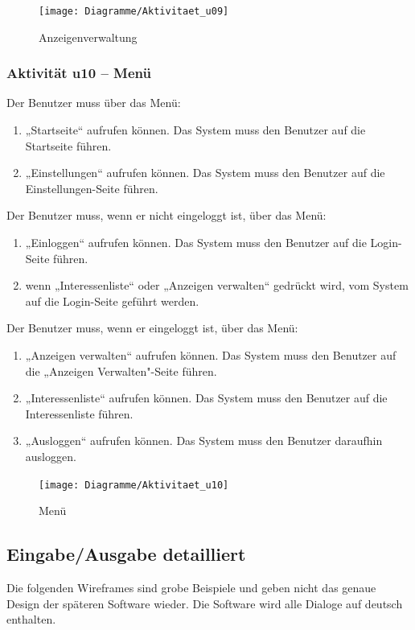 \documentclass[a4paper,12pt,oneside]{scrartcl}
\begin{document}
\begin{figure}[!htbp]
\centering
\noindent\texttt{[image: Diagramme/Aktivitaet\_u09]}
\caption{Anzeigenverwaltung}
\end{figure}
\FloatBarrier

\subsubsection{Aktivität u10 – Menü}
Der Benutzer muss über das Menü:
\begin{enumerate}
	\item „Startseite“ aufrufen können. Das System muss den Benutzer auf die Startseite führen.
	\item „Einstellungen“ aufrufen können. Das System muss den Benutzer auf die Einstellungen-Seite führen.
\end{enumerate}
Der Benutzer muss, wenn er nicht eingeloggt ist, über das Menü:
\begin{enumerate}
	\item „Einloggen“ aufrufen können. Das System muss den Benutzer auf die Login-Seite führen.
	\item wenn „Interessenliste“ oder „Anzeigen verwalten“ gedrückt wird, vom System auf die Login-Seite geführt werden.
\end{enumerate}
Der Benutzer muss, wenn er eingeloggt ist, über das Menü:
\begin{enumerate}
	\item „Anzeigen verwalten“ aufrufen können. Das System muss den Benutzer auf die „Anzeigen Verwalten"-Seite führen.
	\item „Interessenliste“ aufrufen können. Das System muss den Benutzer auf die Interessenliste führen.
	\item „Ausloggen“ aufrufen können. Das System muss den Benutzer daraufhin ausloggen. 
\end{enumerate}

\begin{figure}[!htbp]
\centering
\noindent\texttt{[image: Diagramme/Aktivitaet\_u10]}
\caption{Menü}
\end{figure}
\FloatBarrier


\subsection{Eingabe/Ausgabe detailliert}
Die folgenden Wireframes sind grobe Beispiele und geben nicht das genaue Design der späteren Software wieder.
Die Software wird alle Dialoge auf deutsch enthalten.
\end{document}
